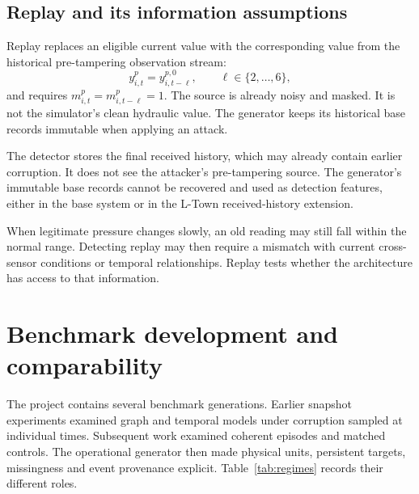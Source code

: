 \subsection{Replay and its information assumptions}
Replay replaces an eligible current value with the corresponding value from the historical pre-tampering observation stream:
\begin{equation}
 y^p_{i,t}=y^{p,0}_{i,t-\ell},\qquad \ell\in\{2,\ldots,6\},
\end{equation}
and requires $m^p_{i,t}=m^p_{i,t-\ell}=1$. The source is already noisy and masked. It is not the simulator's clean hydraulic value. The generator keeps its historical base records immutable when applying an attack.

The detector stores the final received history, which may already contain earlier corruption. It does not see the attacker's pre-tampering source. The generator's immutable base records cannot be recovered and used as detection features, either in the base system or in the L-Town received-history extension.

When legitimate pressure changes slowly, an old reading may still fall within the normal range. Detecting replay may then require a mismatch with current cross-sensor conditions or temporal relationships. Replay tests whether the architecture has access to that information.

\section{Benchmark development and comparability}
The project contains several benchmark generations. Earlier snapshot experiments examined graph and temporal models under corruption sampled at individual times. Subsequent work examined coherent episodes and matched controls. The operational generator then made physical units, persistent targets, missingness and event provenance explicit. Table~\ref{tab:regimes} records their different roles.

